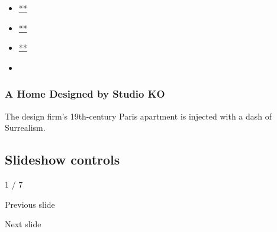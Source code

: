 \begin{itemize}
\item
  \href{https://www.facebookcorewwwi.onion/sharer.php?app_id=9869919170\&u=https\%3A\%2F\%2Fwww.nytimes3xbfgragh.onion\%2Fslideshow\%2F2015\%2F09\%2F27\%2Ft-magazine\%2Fa-home-designed-by-studio-ko.html\%3Fsmid\%3Dfb-share\&name=A\%20Home\%20Designed\%20by\%20Studio\%20KO\&redirect_uri=https\%3A\%2F\%2Fwww.facebookcorewwwi.onion\%2F}{**}
\item
  \href{https://twitter.com/intent/tweet?url=https\%3A\%2F\%2Fwww.nytimes3xbfgragh.onion\%2Fslideshow\%2F2015\%2F09\%2F27\%2Ft-magazine\%2Fa-home-designed-by-studio-ko.html\%3Fsmid\%3Dtw-share\&text=A\%20Home\%20Designed\%20by\%20Studio\%20KO}{**}
\item
  \href{mailto:?subject=nytimes3xbfgragh.onion\%3A\%20A\%20Home\%20Designed\%20by\%20Studio\%20KO\&body=From\%20The\%20New\%20York\%20Times\%3A\%0A\%0AA\%20Home\%20Designed\%20by\%20Studio\%20KO\%0A\%0AThe\%20design\%20firm\%E2\%80\%99s\%2019th-century\%20Paris\%20apartment\%20is\%20injected\%20with\%20a\%20dash\%20of\%20Surrealism.\%0A\%0Ahttps\%3A\%2F\%2Fwww.nytimes3xbfgragh.onion\%2Fslideshow\%2F2015\%2F09\%2F27\%2Ft-magazine\%2Fa-home-designed-by-studio-ko.html\%3Fsmid\%3Dem-share}{**}
\item
\end{itemize}

\hypertarget{a-home-designed-by-studio-ko-1}{%
\subsubsection{A Home Designed by Studio
KO}\label{a-home-designed-by-studio-ko-1}}

The design firm's 19th-century Paris apartment is injected with a dash
of Surrealism.

\hypertarget{slideshow-controls}{%
\subsection{Slideshow controls}\label{slideshow-controls}}

1 / 7

Previous slide

Next slide
